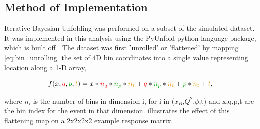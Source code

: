             
    
    \subsection{Method of Implementation}

        Iterative Bayesian Unfolding was performed on a subset of the simulated dataset. It was implemented in this analysis using the PyUnfold \parencite{Bourbeau2018PyUnfold:Unfolding} python language package, which is built off \parencite{DAgostini1995ATheorem}. The dataset was first 'unrolled' or 'flattened' by mapping \eqref{eq:bin_unrolling} the set of 4D bin coordinates into a single value representing location along a 1-D array,
    
    \begin{equation}\label{eq:bin_unrolling}
        {f(\textcolor{black}{x},\textcolor{red}{q},\textcolor{darkgreen}{p},\textcolor{darkorange}{t}) = \textcolor{black}{x}*\textcolor{red}{n_q}*\textcolor{darkgreen}{n_p}*\textcolor{darkorange}{n_t} + \textcolor{red}{q}*\textcolor{darkgreen}{n_p}*\textcolor{darkorange}{n_t} + \textcolor{darkgreen}{p}*\textcolor{darkorange}{n_t} + \textcolor{darkorange}{t}},
    \end{equation}

        where $n_i$ is the number of bins in dimension i, for i in ($x_B$,$Q^2$,$\phi$,t) and x,q,p,t are the bin index for the event in that dimension.  illustrates the effect of this flattening map on a 2x2x2x2 example response matrix. 


